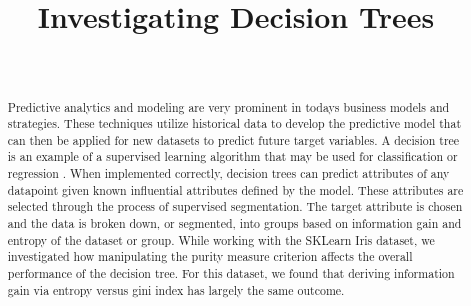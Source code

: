 \documentclass[journal]{IEEEtran}
\begin{document}
\setlength{\emergencystretch}{10pt}



\lstset{style=mystyle}

\title{Investigating Decision Trees}

\author{
\\
}

\maketitle

\begin{abstract}
\label{log:abstract}
Predictive analytics and modeling are very prominent in today\textquotesingle s business models and strategies. These techniques utilize historical data to develop the predictive model that can then be applied for new datasets to predict future target variables. A decision tree is an example of a supervised learning algorithm that may be used for classification or regression \cite{b1}. When implemented correctly, decision trees can predict attributes of any datapoint given known influential attributes defined by the model. These attributes are selected through the process of supervised segmentation. The target attribute is chosen and the data is broken down, or segmented, into groups based on information gain and entropy of the dataset or group. While working with the SKLearn Iris dataset, we investigated how manipulating the purity measure criterion affects the overall performance of the decision tree. For this dataset, we found that deriving information gain via entropy versus gini index has largely the same outcome. 
\end{abstract}
\end{document}
